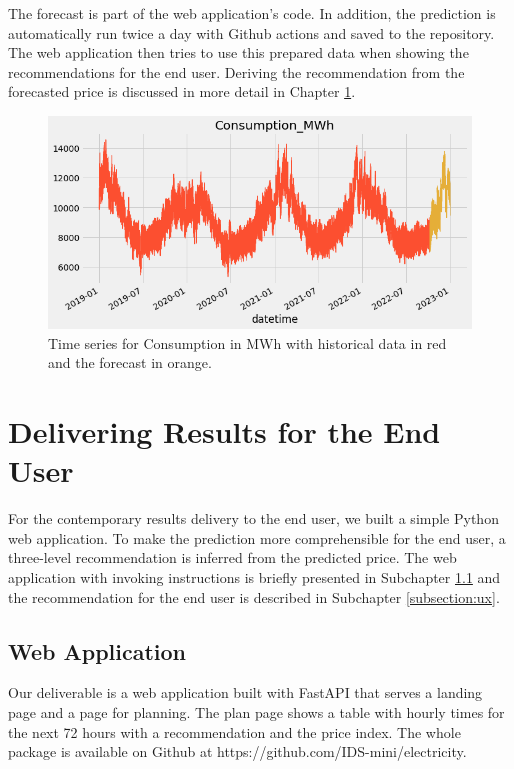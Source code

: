 \documentclass{article}
\begin{document}
The forecast is part of the web application's code. In addition, the prediction is automatically run twice a day with Github actions and saved to the repository. The web application then tries to use this prepared data when showing the recommendations for the end user. Deriving the recommendation from the forecasted price is discussed in more detail in Chapter \ref{section:delivery}. 

\begin{figure}
    \centering
    \includegraphics[width=15cm]{report/images/consumption.png}
    \caption{Time series for Consumption in MWh with historical data in red and the forecast in orange.}
    \label{fig:consumption}
\end{figure}


\section{Delivering Results for the End User}
\label{section:delivery}

For the contemporary results delivery to the end user, we built a simple Python web application. To make the prediction more comprehensible for the end user, a three-level recommendation is inferred from the predicted price. The web application with invoking instructions is briefly presented in Subchapter \ref{subsection:server} and the recommendation for the end user is described in Subchapter \ref{subsection:ux}.

\subsection{Web Application}
\label{subsection:server}

Our deliverable is a web application built with FastAPI that serves a landing page and a page for planning. The plan page shows a table with hourly times for the next 72 hours with a recommendation and the price index. The whole package is available on Github at https://github.com/IDS-mini/electricity.
\end{document}
